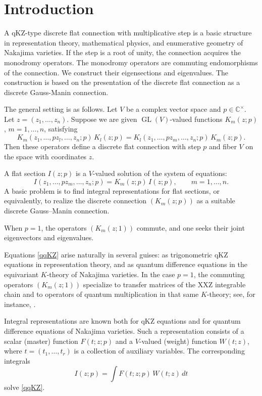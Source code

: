 \documentclass[12pt]{amsart}
\theoremstyle{definition} %
\numberwithin{equation}{section}
\theoremstyle{definition}
\let\on\operatorname
\def\C{{\mathbb C}}
\def\beq{\begin{equation}}
\def\eeq{\end{equation}}
\begin{document}
\section{Introduction}
\label{sec 1}

A qKZ-type discrete flat connection with multiplicative step is a basic
structure in representation theory, mathematical physics, and enumerative geometry of Nakajima varieties. If the step is a root of unity, the connection acquires the monodromy operators. The monodromy operators are commuting endomorphisms of the connection. We construct their eigensections and eigenvalues.
The construction is based on the presentation of the discrete flat connection as a discrete Gauss-Manin connection.

\smallskip
The general setting is as follows.
Let $V$ be a complex vector space and $p\in\C^\times$. Let $z=(z_1,\dots,z_n)$.
Suppose we are given $\on{GL}(V)$-valued functions $K_m(z;p)$, $m=1,\dots,n$, satisfying
\beq
\label{flatness}
K_m(z_1,\dots,pz_l,\dots,z_n;p)\,K_l(z;p)
=
K_l(z_1,\dots,pz_m,\dots,z_n;p)\,K_m(z;p).
\eeq
Then these operators define a discrete flat connection with step $p$ and fiber $V$ on the space with
coordinates $z$.

A flat section $I(z;p)$ is a $V$-valued solution of the system of equations:
\beq
\label{qqKZ}
I(z_1,\dots,pz_m,\dots,z_n;p)=K_m(z;p)\,I(z;p),
\qquad m=1,\dots,n.
\eeq
A basic problem is to find integral representations for flat sections, or equivalently,
to realize the discrete connection $(K_m(z;p))$ as a suitable discrete Gauss--Manin connection.

\smallskip

When $p=1$, the operators $(K_m(z;1))$ commute, and one seeks their joint eigenvectors and
eigenvalues.

\smallskip

Equations \eqref{qqKZ} arise naturally in several guises: as trigonometric qKZ equations in
representation theory, and as quantum difference equations in the equivariant $K$-theory of
Nakajima varieties. In the case $p=1$, the commuting operators $(K_m(z;1))$ specialize to
transfer matrices of the XXZ integrable chain and to operators of quantum multiplication in
that same $K$-theory; see, for instance, \cite{S, FR, EFK, O, OS, AO}.

\smallskip

Integral representations are known both
for qKZ equations and for quantum difference equations of
Nakajima varieties. Such a representation consists of a scalar
(master) function $F(t;z;p)$
and a $V$-valued (weight) function $W(t;z)$, where $t=(t_1,\dots,t_r)$ is a collection of
auxiliary variables. The corresponding integrals
\[
I(z;p)=\int F(t;z;p)\,W(t;z)\,dt
\]
solve \eqref{qqKZ}.
\end{document}
